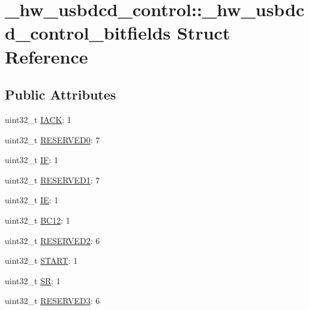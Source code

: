 \hypertarget{struct__hw__usbdcd__control_1_1__hw__usbdcd__control__bitfields}{}\section{\+\_\+hw\+\_\+usbdcd\+\_\+control\+:\+:\+\_\+hw\+\_\+usbdcd\+\_\+control\+\_\+bitfields Struct Reference}
\label{struct__hw__usbdcd__control_1_1__hw__usbdcd__control__bitfields}
\subsection*{Public Attributes}
\begin{DoxyCompactItemize}
\item 
uint32\+\_\+t \hyperlink{struct__hw__usbdcd__control_1_1__hw__usbdcd__control__bitfields_ae2e18e56ad78cc0ef3eb9f200d552c46}{I\+A\+CK}\+: 1
\item 
uint32\+\_\+t \hyperlink{struct__hw__usbdcd__control_1_1__hw__usbdcd__control__bitfields_a35cb17490f19027db776d4f8f82586ea}{R\+E\+S\+E\+R\+V\+E\+D0}\+: 7
\item 
uint32\+\_\+t \hyperlink{struct__hw__usbdcd__control_1_1__hw__usbdcd__control__bitfields_a70d38f4d6f63fc5c24dd39d3ab7f5bb6}{IF}\+: 1
\item 
uint32\+\_\+t \hyperlink{struct__hw__usbdcd__control_1_1__hw__usbdcd__control__bitfields_ad1ca3e242b2bfccce8fab9f52e412914}{R\+E\+S\+E\+R\+V\+E\+D1}\+: 7
\item 
uint32\+\_\+t \hyperlink{struct__hw__usbdcd__control_1_1__hw__usbdcd__control__bitfields_a6d21d205ab28f7c40b7f203e226a2768}{IE}\+: 1
\item 
uint32\+\_\+t \hyperlink{struct__hw__usbdcd__control_1_1__hw__usbdcd__control__bitfields_a07b254521433994441644c85c3e1bb15}{B\+C12}\+: 1
\item 
uint32\+\_\+t \hyperlink{struct__hw__usbdcd__control_1_1__hw__usbdcd__control__bitfields_a48cb0d44b07963a671cba949e4259874}{R\+E\+S\+E\+R\+V\+E\+D2}\+: 6
\item 
uint32\+\_\+t \hyperlink{struct__hw__usbdcd__control_1_1__hw__usbdcd__control__bitfields_a9e0837167f3b525df33837daab7668c4}{S\+T\+A\+RT}\+: 1
\item 
uint32\+\_\+t \hyperlink{struct__hw__usbdcd__control_1_1__hw__usbdcd__control__bitfields_ac59080f548948ce636e9335ae7a8eac9}{SR}\+: 1
\item 
uint32\+\_\+t \hyperlink{struct__hw__usbdcd__control_1_1__hw__usbdcd__control__bitfields_adb4eb65f3809165b6853774976f10a14}{R\+E\+S\+E\+R\+V\+E\+D3}\+: 6
\end{DoxyCompactItemize}


